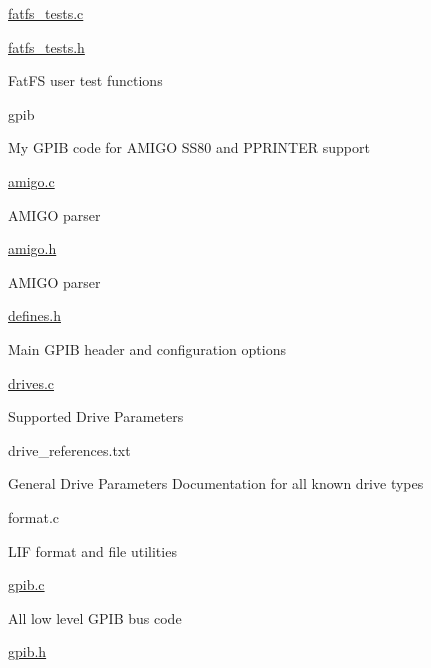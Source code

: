 \begin{DoxyItemize}
\begin{DoxyItemize}
\item \hyperlink{fatfs__tests_8c}{fatfs\+\_\+tests.\+c}
\item \hyperlink{fatfs__tests_8h}{fatfs\+\_\+tests.\+h}
\begin{DoxyItemize}
\item Fat\+FS user test functions
\end{DoxyItemize}
\end{DoxyItemize}
\item gpib
\begin{DoxyItemize}
\item My G\+P\+IB code for A\+M\+I\+GO S\+S80 and P\+P\+R\+I\+N\+T\+ER support
\item \hyperlink{amigo_8c}{amigo.\+c}
\begin{DoxyItemize}
\item A\+M\+I\+GO parser
\end{DoxyItemize}
\item \hyperlink{amigo_8h}{amigo.\+h}
\begin{DoxyItemize}
\item A\+M\+I\+GO parser
\end{DoxyItemize}
\item \hyperlink{defines_8h}{defines.\+h}
\begin{DoxyItemize}
\item Main G\+P\+IB header and configuration options
\end{DoxyItemize}
\item \hyperlink{drives_8c}{drives.\+c}
\begin{DoxyItemize}
\item Supported Drive Parameters
\end{DoxyItemize}
\item drive\+\_\+references.\+txt
\begin{DoxyItemize}
\item General Drive Parameters Documentation for all known drive types
\end{DoxyItemize}
\item format.\+c
\begin{DoxyItemize}
\item L\+IF format and file utilities
\end{DoxyItemize}
\item \hyperlink{gpib_8c}{gpib.\+c}
\begin{DoxyItemize}
\item All low level G\+P\+IB bus code
\end{DoxyItemize}
\item \hyperlink{gpib_8h}{gpib.\+h}

\end{DoxyItemize}
\end{DoxyItemize}
